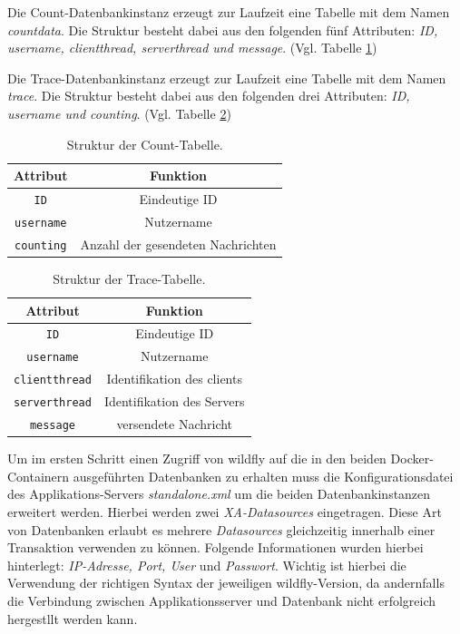 \documentclass[10pt,journal,compsoc]{IEEEtran}
\begin{document}
Die Count-Datenbankinstanz erzeugt zur Laufzeit eine Tabelle mit dem Namen \textit{countdata}. Die Struktur besteht dabei aus den folgenden fünf Attributen: \textit{ID, username, clientthread, serverthread und message}. (Vgl. Tabelle \ref{tab:count})

Die Trace-Datenbankinstanz erzeugt zur Laufzeit eine Tabelle mit dem Namen \textit{trace}. Die Struktur besteht dabei aus den folgenden drei Attributen: \textit{ID, username und counting}. (Vgl. Tabelle \ref{tab:trace})

\begin{table}[h!]
	\caption{Struktur der Count-Tabelle.}
	\label{tab:count}
	\def\arraystretch{1,2} %
	\centering
	\begin{tabular}{|c||c|}\hline
		\textbf{Attribut}  & \textbf{Funktion} \\\hline \hline
		\lstinline|ID|           & Eindeutige ID             \\ \hline
		\lstinline|username|       & Nutzername             \\ \hline
		\lstinline|counting|        & Anzahl der gesendeten Nachrichten             \\\hline
	\end{tabular} 
\end{table}
\begin{table}[h!]
	\caption{Struktur der Trace-Tabelle.}
	\label{tab:trace}
	\def\arraystretch{1,2} %
	\centering
	\begin{tabular}{|c||c|}\hline
		\textbf{Attribut}  & \textbf{Funktion} \\ \hline \hline
		\lstinline|ID|           & Eindeutige ID             \\ \hline
		\lstinline|username|       & Nutzername             \\ \hline
		\lstinline|clientthread|        & Identifikation des clients             \\ \hline
		\lstinline|serverthread|        & Identifikation des Servers           \\ \hline
		\lstinline|message|        & versendete Nachricht             \\\hline 
	\end{tabular} 
\end{table}


Um im ersten Schritt einen Zugriff von wildfly auf die in den beiden Docker-Containern ausgeführten Datenbanken zu erhalten muss die Konfigurationsdatei des Applikations-Servers \textit{standalone.xml} um die beiden Datenbankinstanzen erweitert werden. Hierbei werden zwei \textit{XA-Datasources} eingetragen. Diese Art von Datenbanken erlaubt es mehrere \textit{Datasources} gleichzeitig innerhalb einer Transaktion verwenden zu können. Folgende Informationen wurden hierbei hinterlegt: \textit{IP-Adresse, Port, User} und \textit{Passwort}. 
Wichtig ist hierbei die Verwendung der richtigen Syntax der jeweiligen wildfly-Version, da andernfalls die Verbindung zwischen Applikationsserver und Datenbank nicht erfolgreich hergestllt werden kann. 
\end{document}
